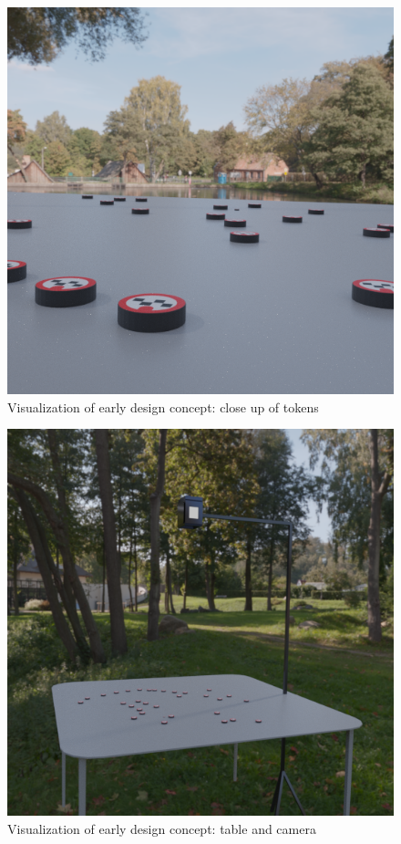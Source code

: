 \begin{multicols}{2}
	\begin{figure}[H]
		\centering
		\includegraphics[width=1\linewidth]{figure/Design/closeup.png}
		\caption{Visualization of early design concept: close up of tokens}
		\label{fig:previz1}
	\end{figure}
	
	\begin{figure}[H]
		\centering
		\includegraphics[width=1\linewidth]{figure/Design/sideview.png}
		\caption{Visualization of early design concept: table and camera}
		\label{fig:previz2}
	\end{figure}
\end{multicols}
